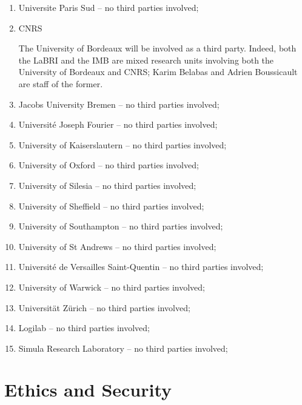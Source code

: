 \documentclass[noworkareas,deliverables,\classoptions]{euproposal}       %
\begin{document}
\begin{proposal}
\begin{enumerate}
\item Universite  Paris Sud -- no third parties involved;

\item CNRS 

The University of Bordeaux will be involved as a third party. Indeed,
both the LaBRI and the IMB are mixed research units involving both the
University of Bordeaux and CNRS; Karim Belabas and Adrien Boussicault
are staff of the former.

\item Jacobs University Bremen -- no third parties involved;
\item Universit\'e Joseph Fourier -- no third parties involved;
\item University of Kaiserslautern -- no third parties involved;
\item University of Oxford -- no third parties involved;
\item University of Silesia -- no third parties involved;
\item University of Sheffield -- no third parties involved;
\item University of Southampton -- no third parties involved;
\item University of St Andrews -- no third parties involved;
\item Universit\'e de Versailles Saint-Quentin -- no third parties involved;
\item University of Warwick -- no third parties involved;
\item Universit\"at Z\"urich -- no third parties involved;
\item Logilab -- no third parties involved;
\item Simula Research Laboratory -- no third parties involved;
\end{enumerate}






\newpage

\section{Ethics and Security}


\end{proposal}
\end{document}

